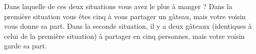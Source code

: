 
\begin{exercice}\label{exosmath-0872}

Dans laquelle de ces deux situations vous avez le plus à manger ? Dans la première situation vous êtes cinq à vous partager un gâteau, mais votre voisin vous donne sa part. Dans la seconde situation, il y a deux gâteaux (identiques à celui de la première situation) à partager en cinq personnes, mais votre voisin garde sa part.

\end{exercice}
